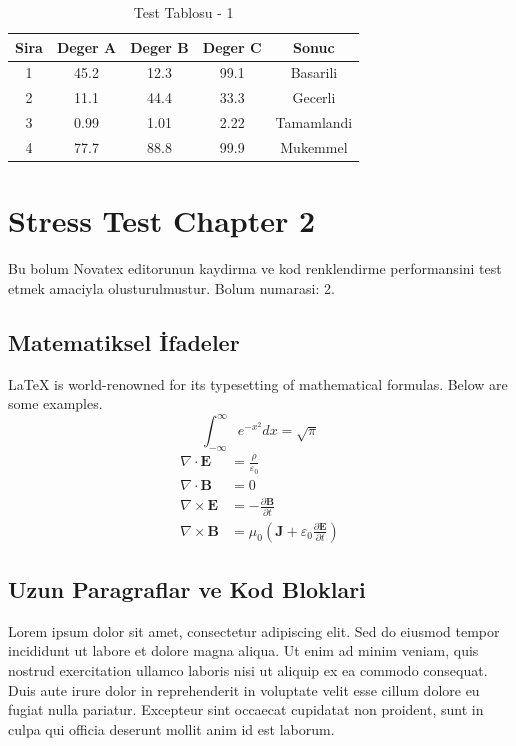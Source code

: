 \documentclass[12pt,a4paper]{article}
\begin{document}
\begin{table}[h!]
\centering
\begin{tabular}{|c|c|c|c|c|}
\hline
\textbf{Sira} & \textbf{Deger A} & \textbf{Deger B} & \textbf{Deger C} & \textbf{Sonuc} \\
\hline
1 & 45.2 & 12.3 & 99.1 & Basarili \\
2 & 11.1 & 44.4 & 33.3 & Gecerli \\
3 & 0.99 & 1.01 & 2.22 & Tamamlandi \\
4 & 77.7 & 88.8 & 99.9 & Mukemmel \\
\hline
\end{tabular}
\caption{Test Tablosu - 1}
\end{table}

\newpage
\section{Stress Test Chapter 2}
Bu bolum Novatex editorunun kaydirma ve kod renklendirme performansini test etmek amaciyla olusturulmustur. Bolum numarasi: 2.

\subsection{Matematiksel İfadeler}
\LaTeX{} is world-renowned for its typesetting of mathematical formulas. Below are some examples.
\begin{equation}
\int_{-\infty}^{\infty} e^{-x^2} dx = \sqrt{\pi}
\end{equation}
\begin{align}
\nabla \cdot \mathbf{E} &= \frac{\rho}{\varepsilon_0} \\
\nabla \cdot \mathbf{B} &= 0 \\
\nabla \times \mathbf{E} &= -\frac{\partial \mathbf{B}}{\partial t} \\
\nabla \times \mathbf{B} &= \mu_0\left(\mathbf{J} + \varepsilon_0 \frac{\partial \mathbf{E}}{\partial t}\right)
\end{align}
\subsection{Uzun Paragraflar ve Kod Bloklari}
Lorem ipsum dolor sit amet, consectetur adipiscing elit. Sed do eiusmod tempor incididunt ut labore et dolore magna aliqua. Ut enim ad minim veniam, quis nostrud exercitation ullamco laboris nisi ut aliquip ex ea commodo consequat. Duis aute irure dolor in reprehenderit in voluptate velit esse cillum dolore eu fugiat nulla pariatur. Excepteur sint occaecat cupidatat non proident, sunt in culpa qui officia deserunt mollit anim id est laborum.
\end{document}
